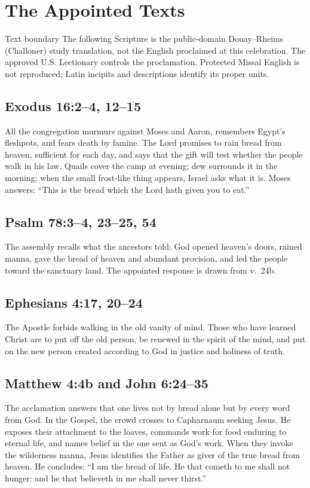 \section*{The Appointed Texts}

\begin{studybox}{Text boundary}
The following Scripture is the public-domain Douay--Rheims (Challoner) study
translation, not the English proclaimed at this celebration. The approved
U.S. Lectionary controls the proclamation. Protected Missal English is not
reproduced; Latin incipits and descriptions identify its proper units.
\end{studybox}

\subsection*{Exodus 16:2--4, 12--15}
All the congregation murmurs against Moses and Aaron, remembers Egypt's
fleshpots, and fears death by famine. The Lord promises to rain bread from
heaven, sufficient for each day, and says that the gift will test whether the
people walk in his law. Quails cover the camp at evening; dew surrounds it in
the morning; when the small frost-like thing appears, Israel asks what it is.
Moses answers: ``This is the bread which the Lord hath given you to eat.''

\subsection*{Psalm 78:3--4, 23--25, 54}
The assembly recalls what the ancestors told: God opened heaven's doors,
rained manna, gave the bread of heaven and abundant provision, and led the
people toward the sanctuary land. The appointed response is drawn from
v.~24b.

\subsection*{Ephesians 4:17, 20--24}
The Apostle forbids walking in the old vanity of mind. Those who have learned
Christ are to put off the old person, be renewed in the spirit of the mind,
and put on the new person created according to God in justice and holiness of
truth.

\subsection*{Matthew 4:4b and John 6:24--35}
The acclamation answers that one lives not by bread alone but by every word
from God. In the Gospel, the crowd crosses to Capharnaum seeking Jesus. He
exposes their attachment to the loaves, commands work for food enduring to
eternal life, and names belief in the one sent as God's work. When they invoke
the wilderness manna, Jesus identifies the Father as giver of the true bread
from heaven. He concludes: ``I am the bread of life. He that cometh to me
shall not hunger: and he that believeth in me shall never thirst.''

